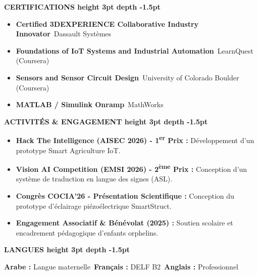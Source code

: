 \documentclass[10pt,a4paper]{altacv}
\renewcommand{\cvsection}[2][]{%
  \vspace{4pt}%
  {\color{heading}\Large\bfseries #2 \hspace{0.2em}\leaders\vrule height 3pt depth -1.5pt\hfill\mbox{}}\par\vspace{3pt}
}
\begin{document}
\cvsection{CERTIFICATIONS}
\begin{itemize}[leftmargin=*, label=\textbullet, nosep, itemsep=1.5pt]
  \item \textbf{Certified 3DEXPERIENCE Collaborative Industry Innovator}~\hfill {\color{emphasis}Dassault Systèmes}
  \item \textbf{Foundations of IoT Systems and Industrial Automation}~\hfill {\color{emphasis}LearnQuest (Coursera)}
  \item \textbf{Sensors and Sensor Circuit Design}~\hfill {\color{emphasis}University of Colorado Boulder (Coursera)}
  \item \textbf{MATLAB / Simulink Onramp}~\hfill {\color{emphasis}MathWorks}
\end{itemize}

\cvsection{ACTIVITÉS \& ENGAGEMENT}
\begin{itemize}[leftmargin=*, label=\textbullet, nosep, itemsep=1.5pt]
  \item \textbf{Hack The Intelligence (AISEC 2026) - 1\textsuperscript{er} Prix :} Développement d’un prototype Smart Agriculture IoT.
  \item \textbf{Vision AI Competition (EMSI 2026) - 2\textsuperscript{ème} Prix :} Conception d’un système de traduction en langue des signes (ASL).
  \item \textbf{Congrès COCIA’26 - Présentation Scientifique :} Conception du prototype d’éclairage piézoélectrique SmartStruct.
  \item \textbf{Engagement Associatif \& Bénévolat (2025) :} Soutien scolaire et encadrement pédagogique d'enfants orphelins.
\end{itemize}

\cvsection{LANGUES}
\textbf{Arabe :} Langue maternelle~\hfill \textbf{Français :} DELF B2~\hfill \textbf{Anglais :} Professionnel
\end{document}
